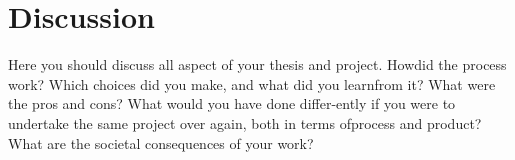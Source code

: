 \chapter{Discussion}
Here you should discuss all aspect of your thesis and project. Howdid the process work? Which choices did you make, and what did you learnfrom it? What were the pros and cons? What would you have done differ-ently if you were to undertake the same project over again, both in terms ofprocess and product? What are the societal consequences of your work?